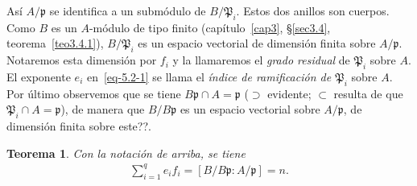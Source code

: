 \documentclass[10pt,oneside,bibtotoc,smallheadings,leqno,a5paper,DIV=12]{scrbook}
\newcommand{\idl}[1]{\mathfrak{#1}}
\numberwithin{equation}{section}
\theoremstyle{defi}
\theoremstyle{enonce}
\newtheorem{theorem}{Teorema}
\theoremstyle{rem}
\numberwithin{theorem}{section}
\numberwithin{proposition}{section}
\numberwithin{definition}{section}
\numberwithin{lemma}{section}
\numberwithin{corollary}{section}
\numberwithin{example}{section}
\numberwithin{footnote}{section}%
\begin{document}
As\'i $A/\idl{p}$ se identifica a un subm\'odulo de $B/\idl{P}_{i}$. Estos dos anillos son cuerpos. Como $B$
es un $A$-m\'odulo de tipo finito (cap\'itulo~\ref{cap3}, \S\ref{sec3.4}, teorema~\ref{teo3.4.1}),
$B/\idl{P}_{i}$ es un espacio vectorial
de dimensi\'on finita sobre $A/\idl{p}$. Notaremos esta dimensi\'on por $f_{i}$ y la llamaremos el
{\em grado residual} de $\idl{P}_{i}$ sobre $A$. El exponente $e_{i}$ en~\eqref{eq-5.2-1} se llama el
{\em \'indice de ramificaci\'on de $\idl{P}_{i}$} sobre $A$. Por \'ultimo observemos que se tiene
$B\idl{p}\cap A = \idl{p}$ ($\supset$ evidente; $\subset$ resulta de que $\idl{P}_{i}\cap A=\idl{p}$), de manera
que $B/B\idl{p}$ es un espacio vectorial sobre $A/\idl{p}$, de dimensi\'on finita sobre este??.

\begin{theorem}\label{teo5.2.1}
Con la notaci\'on de arriba, se tiene
\begin{gather}\label{eq-5.2-2}
\sum_{i=1}^{q}e_{i}f_{i}=[B/B\idl{p}:A/\idl{p}]=n.
\end{gather}
\end{theorem}
\end{document}
